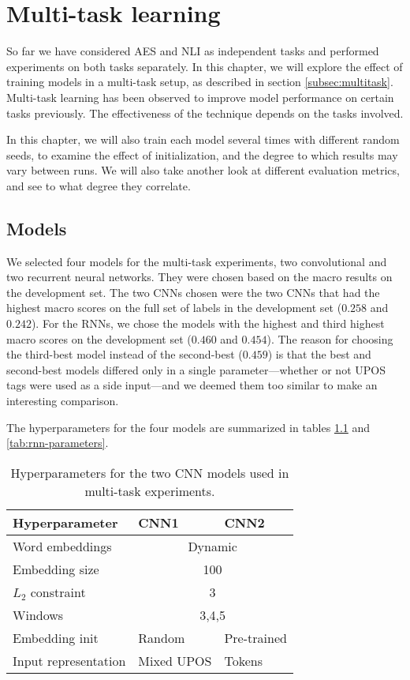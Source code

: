 \chapter{Multi-task learning}

So far we have considered \ac{AES} and \ac{NLI} as independent tasks and
performed experiments on both tasks separately. In this chapter, we will
explore the effect of training models in a multi-task setup, as described in
section \ref{subsec:multitask}. Multi-task learning has been observed to
improve model performance on certain tasks previously. The effectiveness of
the technique depends on the tasks involved.

In this chapter, we will also train each model several times with different
random seeds, to examine the effect of initialization, and the degree to
which results may vary between runs. We will also take another look at
different evaluation metrics, and see to what degree they correlate.


\section{Models}

We selected four models for the multi-task experiments, two convolutional and
two recurrent neural networks. They were chosen based on the macro \FI
results on the development set. The two \acp{CNN} chosen were the two
\acp{CNN} that had the highest macro \FI scores on the full set of labels in
the development set ($0.258$ and $0.242$). For the \acp{RNN}, we chose the
models with the highest and third highest macro \FI scores on the development
set ($0.460$ and $0.454$). The reason for choosing the third-best model
instead of the second-best ($0.459$) is that the best and second-best models
differed only in a single parameter---whether or not UPOS tags were used as a
side input---and we deemed them too similar to make an interesting
comparison.

The hyperparameters for the four models are
summarized in tables \ref{tab:cnn-parameters} and \ref{tab:rnn-parameters}.

\begin{table}
  \centering
  \begin{tabular}{lll}
    \toprule
    Hyperparameter       & CNN1 & CNN2 \\
    \midrule
    Word embeddings      & \multicolumn{2}{c}{Dynamic} \\
    Embedding size       & \multicolumn{2}{c}{100} \\
    $L_2$ constraint     & \multicolumn{2}{c}{3} \\
    Windows              & \multicolumn{2}{c}{3,4,5} \\
    Embedding init       & Random & Pre-trained \\
    Input representation & Mixed UPOS & Tokens \\
    \bottomrule
  \end{tabular}
  \caption[Descriptions of the two CNN models]{
    Hyperparameters for the two CNN models used in multi-task experiments.
  }
  \label{tab:cnn-parameters}
\end{table}

